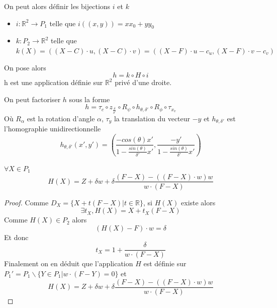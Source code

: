 On peut alors définir les bijections $i$ et $k$
\begin{itemize}
\item $i:\mathbb{R}^{2}\rightarrow P_{1}$ telle que $i((x,y))=xx_{0}+yy_{0}$
\item $k:P_{2}\rightarrow \mathbb{R}^{2}$ telle que $k(X)= ((X-C)\cdot u,(X-C)\cdot v)=((X-F)\cdot u-c_{u}, (X-F)\cdot v-c_{v})$
\end{itemize}
On pose alors 
\begin{equation*}
h=k\circ H \circ i
\end{equation*}
h est une application définie sur $\mathbb{R}^{2}$ privé d'une droite.
\begin{prop}
On peut factoriser $h$ sous la forme
\begin{equation}
h = \tau_{c} \circ z_{\frac{\delta}{\delta'}}  \circ R_{\psi} \circ h_{\theta,\delta'} \circ R_{\phi} \circ \tau_{x_{v}}
\label{formul_decomp}
\end{equation}
Où $R_{\alpha}$ est la rotation d'angle $\alpha$, $\tau_y$ la translation du vecteur $-y$ et $h_{\theta,\delta'}$ est l'homographie unidirectionnelle 
\begin{equation*}
h_{\theta,\delta'}(x',y')=\left(\frac{-cos(\theta)x'}{1-\frac{sin(\theta)}{\delta'}x'} ,\frac{-y'}{1-\frac{sin(\theta)}{\delta'}x'}\right)
\end{equation*}
\end{prop}


\begin{lem}$
\forall X \in P_1$
\begin{equation*}
H(X)=Z+\delta w+\delta \frac{(F-X)-\left((F-X)\cdot w\right) w}{w\cdot (F-X)}
\end{equation*}
\end{lem}

\begin{proof}
Comme $D_{X}=\{X+t(F-X)|t\in\mathbb{R}\}$, si $H(X)$ existe alors 
\begin{equation*}
\exists t_{X},H(X)=X+t_{X}(F-X)
\end{equation*}
Comme $H(X)\in P_{2}$ alors
\begin{equation*}
(H(X)-F)\cdot w =\delta
\end{equation*}
Et donc 
\begin{equation*}
t_{X}=1+\frac{\delta}{w\cdot(F-X)}
\end{equation*}
Finalement on en déduit que l'application $H$ est définie sur $P_{1}'=P_{1}\backslash \{Y\in P_{1}|w\cdot(F-Y)=0\}$ et 
\begin{equation*}
H(X)=Z+\delta w+\delta \frac{(F-X)-\left((F-X)\cdot w\right) w}{w\cdot (F-X)}
\end{equation*}
\end{proof}

